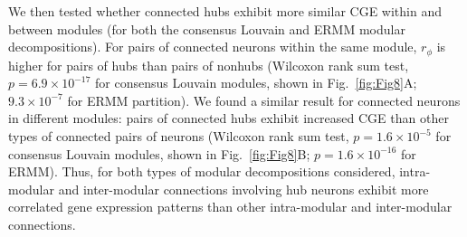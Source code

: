 \documentclass[10pt,letterpaper]{article}
\begin{document}
{%
We then tested whether connected hubs exhibit more similar CGE within and between modules (for both the consensus Louvain and ERMM modular decompositions).
For pairs of connected neurons within the same module, $r_\phi$ is higher for pairs of hubs than pairs of nonhubs (Wilcoxon rank sum test, $p = 6.9\times 10^{-17}$ for consensus Louvain modules, shown in Fig.~\ref{fig:Fig8}A; $9.3 \times 10^{-7}$ for ERMM partition).
We found a similar result for connected neurons in different modules: pairs of connected hubs exhibit increased CGE than other types of connected pairs of neurons (Wilcoxon rank sum test, $p = 1.6 \times 10^{-5}$ for consensus Louvain modules, shown in Fig.~\ref{fig:Fig8}B; $p = 1.6 \times 10^{-16}$ for ERMM).
Thus, for both types of modular decompositions considered, intra-modular and inter-modular connections involving hub neurons exhibit more correlated gene expression patterns than other intra-modular and inter-modular connections.
}
\end{document}
